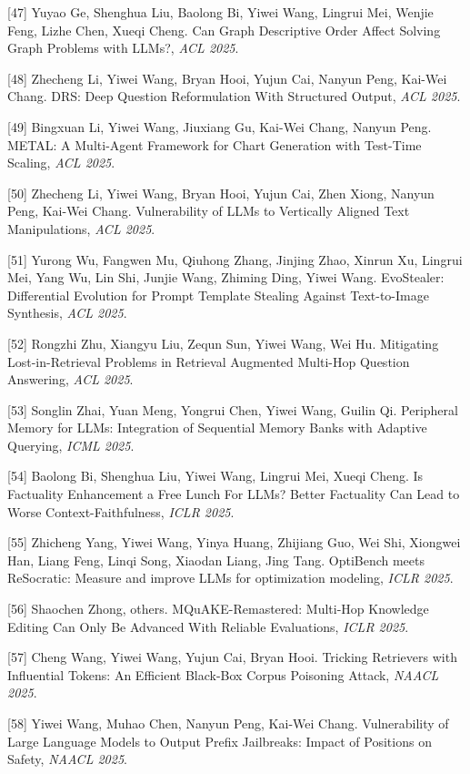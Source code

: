 [47] Yuyao Ge, Shenghua Liu, Baolong Bi, Yiwei Wang, Lingrui Mei, Wenjie Feng, Lizhe Chen, Xueqi Cheng. Can Graph Descriptive Order Affect Solving Graph Problems with LLMs?, \textit{ACL 2025}.

[48] Zhecheng Li, Yiwei Wang, Bryan Hooi, Yujun Cai, Nanyun Peng, Kai-Wei Chang. DRS: Deep Question Reformulation With Structured Output, \textit{ACL 2025}.

[49] Bingxuan Li, Yiwei Wang, Jiuxiang Gu, Kai-Wei Chang, Nanyun Peng. METAL: A Multi-Agent Framework for Chart Generation with Test-Time Scaling, \textit{ACL 2025}.

[50] Zhecheng Li, Yiwei Wang, Bryan Hooi, Yujun Cai, Zhen Xiong, Nanyun Peng, Kai-Wei Chang. Vulnerability of LLMs to Vertically Aligned Text Manipulations, \textit{ACL 2025}.

[51] Yurong Wu, Fangwen Mu, Qiuhong Zhang, Jinjing Zhao, Xinrun Xu, Lingrui Mei, Yang Wu, Lin Shi, Junjie Wang, Zhiming Ding, Yiwei Wang. EvoStealer: Differential Evolution for Prompt Template Stealing Against Text-to-Image Synthesis, \textit{ACL 2025}.

[52] Rongzhi Zhu, Xiangyu Liu, Zequn Sun, Yiwei Wang, Wei Hu. Mitigating Lost-in-Retrieval Problems in Retrieval Augmented Multi-Hop Question Answering, \textit{ACL 2025}.

[53] Songlin Zhai, Yuan Meng, Yongrui Chen, Yiwei Wang, Guilin Qi. Peripheral Memory for LLMs: Integration of Sequential Memory Banks with Adaptive Querying, \textit{ICML 2025}.

[54] Baolong Bi, Shenghua Liu, Yiwei Wang, Lingrui Mei, Xueqi Cheng. Is Factuality Enhancement a Free Lunch For LLMs? Better Factuality Can Lead to Worse Context-Faithfulness, \textit{ICLR 2025}.

[55] Zhicheng Yang, Yiwei Wang, Yinya Huang, Zhijiang Guo, Wei Shi, Xiongwei Han, Liang Feng, Linqi Song, Xiaodan Liang, Jing Tang. OptiBench meets ReSocratic: Measure and improve LLMs for optimization modeling, \textit{ICLR 2025}.

[56] Shaochen Zhong, others. MQuAKE-Remastered: Multi-Hop Knowledge Editing Can Only Be Advanced With Reliable Evaluations, \textit{ICLR 2025}.

[57] Cheng Wang, Yiwei Wang, Yujun Cai, Bryan Hooi. Tricking Retrievers with Influential Tokens: An Efficient Black-Box Corpus Poisoning Attack, \textit{NAACL 2025}.

[58] Yiwei Wang, Muhao Chen, Nanyun Peng, Kai-Wei Chang. Vulnerability of Large Language Models to Output Prefix Jailbreaks: Impact of Positions on Safety, \textit{NAACL 2025}.


